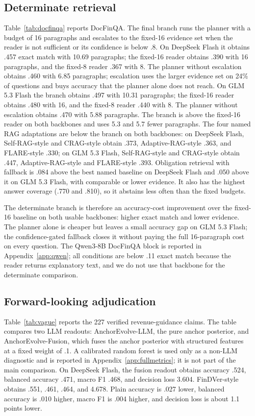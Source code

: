 \documentclass[11pt]{article}
\begin{document}
\subsection{Determinate retrieval}
Table~\ref{tab:docfinqa} reports DocFinQA. The final branch runs the planner with a budget of 16 paragraphs and escalates to the fixed-16 evidence set when the reader is not sufficient or its confidence is below .8. On DeepSeek Flash it obtains .457 exact match with 10.69 paragraphs; the fixed-16 reader obtains .390 with 16 paragraphs, and the fixed-8 reader .367 with 8. The planner without escalation obtains .460 with 6.85 paragraphs; escalation uses the larger evidence set on 24\% of questions and buys accuracy that the planner alone does not reach. On GLM 5.3 Flash the branch obtains .497 with 10.31 paragraphs; the fixed-16 reader obtains .480 with 16, and the fixed-8 reader .440 with 8. The planner without escalation obtains .470 with 5.88 paragraphs. The branch is above the fixed-16 reader on both backbones and uses 5.3 and 5.7 fewer paragraphs. The four named RAG adaptations are below the branch on both backbones: on DeepSeek Flash, Self-RAG-style and CRAG-style obtain .373, Adaptive-RAG-style .363, and FLARE-style .330; on GLM 5.3 Flash, Self-RAG-style and CRAG-style obtain .447, Adaptive-RAG-style and FLARE-style .393. Obligation retrieval with fallback is .084 above the best named baseline on DeepSeek Flash and .050 above it on GLM 5.3 Flash, with comparable or lower evidence. It also has the highest answer coverage (.770 and .810), so it abstains less often than the fixed budgets.

The determinate branch is therefore an accuracy-cost improvement over the fixed-16 baseline on both usable backbones: higher exact match and lower evidence. The planner alone is cheaper but leaves a small accuracy gap on GLM 5.3 Flash; the confidence-gated fallback closes it without paying the full 16-paragraph cost on every question. The Qwen3-8B DocFinQA block is reported in Appendix~\ref{app:qwen}; all conditions are below .11 exact match because the reader returns explanatory text, and we do not use that backbone for the determinate comparison.



\subsection{Forward-looking adjudication}
Table~\ref{tab:vague} reports the 227 verified revenue-guidance claims. The table compares two LLM readouts: AnchorEvolve-LLM, the pure anchor posterior, and AnchorEvolve-Fusion, which fuses the anchor posterior with structured features at a fixed weight of .1. A calibrated random forest is used only as a non-LLM diagnostic and is reported in Appendix~\ref{app:fullmetrics}; it is not part of the main comparison. On DeepSeek Flash, the fusion readout obtains accuracy .524, balanced accuracy .471, macro F1 .468, and decision loss 3.604. FinDVer-style obtains .551, .461, .464, and 4.678. Plain accuracy is .027 lower, balanced accuracy is .010 higher, macro F1 is .004 higher, and decision loss is about 1.1 points lower.
\end{document}
